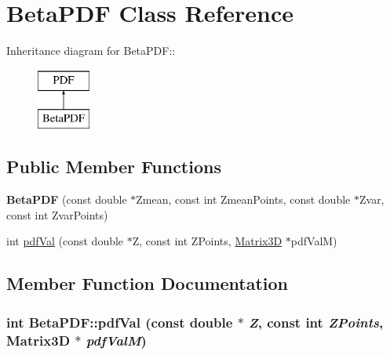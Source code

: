 \hypertarget{classBetaPDF}{
\section{BetaPDF Class Reference}
\label{de/d4f/classBetaPDF}
}
Inheritance diagram for BetaPDF::\begin{figure}[H]
\begin{center}
\leavevmode
\includegraphics[height=2cm]{de/d4f/classBetaPDF}
\end{center}
\end{figure}
\subsection*{Public Member Functions}
\begin{DoxyCompactItemize}
\item 
\hypertarget{classBetaPDF_a0b5160ebefdcd8b696a45a131bab3261}{
{\bfseries BetaPDF} (const double $\ast$Zmean, const int ZmeanPoints, const double $\ast$Zvar, const int ZvarPoints)}
\label{de/d4f/classBetaPDF_a0b5160ebefdcd8b696a45a131bab3261}

\item 
int \hyperlink{classBetaPDF_a5c27da056f9c9b17af0888fac7df2c9f}{pdfVal} (const double $\ast$Z, const int ZPoints, \hyperlink{classMatrix3D}{Matrix3D} $\ast$pdfValM)
\end{DoxyCompactItemize}


\subsection{Member Function Documentation}
\hypertarget{classBetaPDF_a5c27da056f9c9b17af0888fac7df2c9f}{
\subsubsection[{pdfVal}]{\setlength{\rightskip}{0pt plus 5cm}int BetaPDF::pdfVal (const double $\ast$ {\em Z}, \/  const int {\em ZPoints}, \/  {\bf Matrix3D} $\ast$ {\em pdfValM})}}
\label{de/d4f/classBetaPDF_a5c27da056f9c9b17af0888fac7df2c9f}


